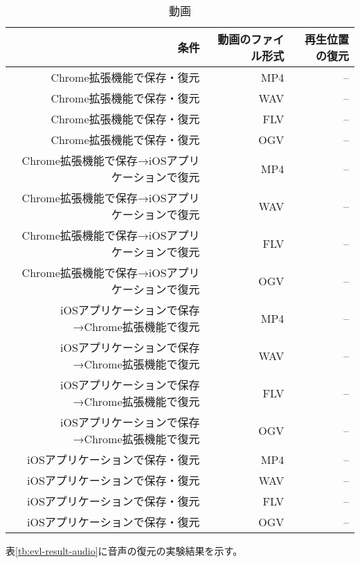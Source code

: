 \begin{table}[htbp]
  \caption{動画}
  \label{tb:evl-result-video}
  \begin{center}
    \begin{tabular}{rrr}
      \hline
      条件 & 動画のファイル形式 & 再生位置の復元 \\ \hline \hline
      Chrome拡張機能で保存・復元 & MP4 & --  \\ \hline
      Chrome拡張機能で保存・復元 & WAV & --  \\ \hline
      Chrome拡張機能で保存・復元 & FLV & --  \\ \hline
      Chrome拡張機能で保存・復元 & OGV & --  \\ \hline
      Chrome拡張機能で保存→iOSアプリケーションで復元 & MP4 & --  \\ \hline
      Chrome拡張機能で保存→iOSアプリケーションで復元 & WAV & --  \\ \hline
      Chrome拡張機能で保存→iOSアプリケーションで復元 & FLV & --  \\ \hline
      Chrome拡張機能で保存→iOSアプリケーションで復元 & OGV & --  \\ \hline
      iOSアプリケーションで保存→Chrome拡張機能で復元 & MP4 & --  \\ \hline
      iOSアプリケーションで保存→Chrome拡張機能で復元 & WAV & --  \\ \hline
      iOSアプリケーションで保存→Chrome拡張機能で復元 & FLV & --  \\ \hline
      iOSアプリケーションで保存→Chrome拡張機能で復元 & OGV & --  \\ \hline
      iOSアプリケーションで保存・復元 & MP4 & --  \\ \hline
      iOSアプリケーションで保存・復元 & WAV & --  \\ \hline
      iOSアプリケーションで保存・復元 & FLV & --  \\ \hline
      iOSアプリケーションで保存・復元 & OGV & --  \\ \hline
    \end{tabular}
  \end{center}
\end{table}

表\ref{tb:evl-result-audio}に音声の復元の実験結果を示す。

